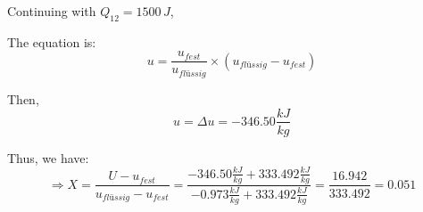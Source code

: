 Continuing with \( Q_{12} = 1500 \, J \),

The equation is:
\[ u = \frac{u_{fest}}{u_{flüssig}} \times (u_{flüssig} - u_{fest}) \]

Then,
\[ u = \Delta u = -346.50 \frac{kJ}{kg} \]

Thus, we have:
\[ \Rightarrow X = \frac{U - u_{fest}}{u_{flüssig} - u_{fest}} = \frac{-346.50 \frac{kJ}{kg} + 333.492 \frac{kJ}{kg}}{-0.973 \frac{kJ}{kg} + 333.492 \frac{kJ}{kg}} = \frac{16.942}{333.492} = 0.051 \]
